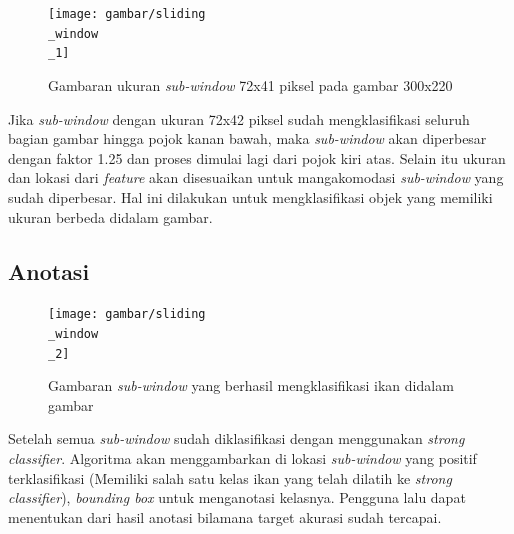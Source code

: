 \begin{figure}[H]
  \centering{}
	\texttt{[image: gambar/sliding\\\_window\\\_1]}
  \caption{Gambaran ukuran \emph{sub-window} 72x41 piksel pada gambar 300x220}
\end{figure}

Jika \emph{sub-window} dengan ukuran 72x42 piksel sudah mengklasifikasi 
seluruh bagian gambar hingga pojok kanan bawah, maka \emph{sub-window} 
akan diperbesar dengan faktor 1.25 dan proses dimulai lagi dari pojok kiri atas. 
Selain itu ukuran dan lokasi dari \emph{feature} akan disesuaikan untuk mangakomodasi 
\emph{sub-window} yang sudah diperbesar. Hal ini dilakukan untuk mengklasifikasi 
objek yang memiliki ukuran berbeda didalam gambar.

\subsection{Anotasi}

\begin{figure}[H]
  \centering{}
	\texttt{[image: gambar/sliding\\\_window\\\_2]}
  \caption{Gambaran \textit{sub-window} yang berhasil mengklasifikasi ikan didalam gambar}
\end{figure}

Setelah semua \textit{sub-window} sudah diklasifikasi dengan menggunakan 
\emph{strong classifier}. Algoritma akan menggambarkan di lokasi \textit{sub-window} 
yang positif terklasifikasi (Memiliki salah satu kelas ikan yang telah dilatih ke \emph{strong classifier}), 
\emph{bounding box} untuk menganotasi kelasnya. Pengguna lalu dapat menentukan 
dari hasil anotasi bilamana target akurasi sudah tercapai.


